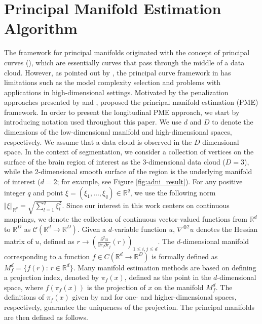 \documentclass[11pt,reqno]{article}
\theoremstyle{definition}
\begin{document}
\section{Principal Manifold Estimation Algorithm}\label{s:PME}

The framework for principal manifolds originated with the concept of principal curves (\cite{hastiePrincipalCurves1989}), which are essentially curves that pass through the middle of a data cloud. However, as pointed out by \cite{duchamp1996extremal}, the principal curve framework in \cite{hastiePrincipalCurves1989} has limitations such as the model complexity selection and problems with applications in high-dimensional settings. Motivated by the penalization approaches presented by \cite{kegl2000learning} and \cite{smolaRegularizedPrincipalManifolds2001}, \cite{mengPrincipalManifoldEstimation2021} proposed the principal manifold estimation (PME) framework. In order to present the longitudinal PME approach, we start by introducing notation used throughout this paper. We use $d$ and $D$ to denote the dimensions of the low-dimensional manifold and high-dimensional spaces, respectively. We assume that a data cloud is observed in the $D$ dimensional space. In the context of segmentation, we consider a collection of vertices on the surface of the brain region of interest as the 3-dimensional data cloud ($D=3$), while the 2-dimensional smooth surface of the region is the underlying manifold of interest ($d=2$; for example, see Figure \ref{fig:adni_result}). For any positive integer $q$ and point $\xi=(\xi_1,\ldots,\xi_q)\in\mathbb{R}^q$, we use the following norm $\Vert \xi\Vert_{\mathbb{R}^q}=\sqrt{\sum_{l=1}^q \xi_l^2}$. Since our interest in this work centers on continuous mappings, we denote the collection of continuous vector-valued functions from $\mathbb{R}^d$ to $\mathbb{R}^D$ as $\mathcal{C}(\mathbb{R}^{d} \to \mathbb{R}^{D})$. Given a $d$-variable function $u$, $\nabla^{\otimes 2} u$ denotes the Hessian matrix of $u$, defined as $r \to \left( \frac{\partial ^2 u}{\partial r_i \partial r_j}(r) \right)_{1 \leq i, j \leq d}$. The $d$-dimensional manifold corresponding to a function $f \in C(\mathbb{R}^{d} \to \mathbb{R}^{D})$ is formally defined as $M_f^d=\{f(r):\,r\in\mathbb{R}^d\}$. Many manifold estimation methods are based on defining a projection index, denoted by $\pi_f(x)$, defined as the point in the $d$-dimensional space, where $f(\pi_f(x))$ is the projection of $x$ on the manifold $M_f^d$. The definitions of $\pi_f(x)$ given by \cite{hastiePrincipalCurves1989} and \cite{mengPrincipalManifoldEstimation2021} for one- and higher-dimensional spaces, respectively, guarantee the uniqueness of the projection. The principal manifolds are then defined as follows.
\end{document}
